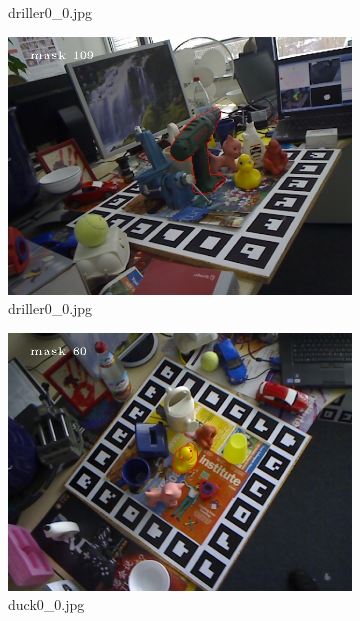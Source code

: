 \documentclass{article}
\begin{document}
\begin{figure}[H]
\begin{subfigure}{.5\textwidth}
  \caption{driller0\_0.jpg}
\end{subfigure}
\begin{subfigure}{.5\textwidth}
  \centering
  \includegraphics[width=.9\linewidth]{Images/driller_refinement.jpg}  
  \caption{driller0\_0.jpg}
\end{subfigure}
\newline
\vspace{0.5cm}
\begin{subfigure}{.5\textwidth}
  \centering
  \includegraphics[width=.9\linewidth]{Images/duck_dist.jpg}  
  \caption{duck0\_0.jpg}
\end{subfigure}
\begin{subfigure}{.5\textwidth}
  \centering

\end{subfigure}
\end{figure}
\end{document}
